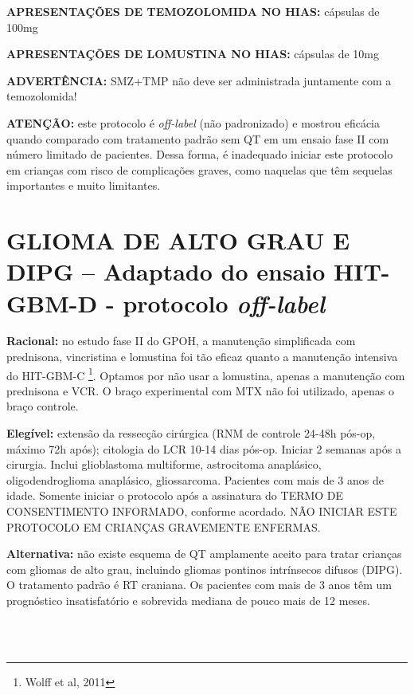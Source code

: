 \documentclass[11pt,a4paper,oldfontcommands]{memoir}
\begin{document}
\textbf{APRESENTAÇÕES DE TEMOZOLOMIDA NO HIAS:} cápsulas de 100mg

\textbf{APRESENTAÇÕES DE LOMUSTINA NO HIAS:} cápsulas de 10mg

\textbf{ADVERTÊNCIA:} SMZ+TMP não deve ser administrada juntamente com a temozolomida!

\textbf{ATENÇÃO:} este protocolo é \textit{off-label} (não padronizado) e mostrou eficácia quando comparado com tratamento padrão sem QT em um ensaio fase II com número limitado de pacientes. Dessa forma, é inadequado iniciar este protocolo em crianças com risco de complicações graves, como naquelas que têm sequelas importantes e muito limitantes.\\
\cleardoublepage

\section{GLIOMA DE ALTO GRAU E DIPG -- Adaptado do ensaio HIT-GBM-D - protocolo \textit{off-label}}
{\let\thefootnote\relax{}}

\textbf{Racional:} no estudo fase II do GPOH, a manutenção simplificada com prednisona, vincristina e lomustina foi tão eficaz quanto a manutenção intensiva do HIT-GBM-C \footnote{Wolff et al, 2011}. Optamos por não usar a lomustina, apenas a manutenção com prednisona e VCR. O braço experimental com MTX não foi utilizado, apenas o braço controle.

\textbf{Elegível:} extensão da ressecção cirúrgica (RNM de controle 24-48h pós-op, máximo 72h após); citologia do LCR 10-14 dias pós-op. Iniciar 2 semanas após a cirurgia. Inclui glioblastoma multiforme, astrocitoma anaplásico, oligodendroglioma anaplásico, gliossarcoma. Pacientes com mais de 3 anos de idade. Somente iniciar o protocolo após a assinatura do TERMO DE CONSENTIMENTO INFORMADO, conforme acordado. NÃO INICIAR ESTE PROTOCOLO EM CRIANÇAS GRAVEMENTE ENFERMAS.

\textbf{Alternativa:} não existe esquema de QT amplamente aceito para tratar crianças com gliomas de alto grau, incluindo gliomas pontinos intrínsecos difusos (DIPG). O tratamento padrão é RT craniana. Os pacientes com mais de 3 anos têm um prognóstico insatisfatório e sobrevida mediana de pouco mais de 12 meses.

\hfill \\

\hfill  {}\\
\end{document}
